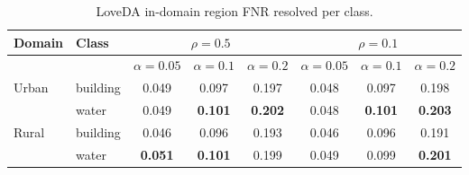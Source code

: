 \begin{table}[t]
\centering
\scriptsize
\setlength{\tabcolsep}{2pt}
\begin{tabular}{llcccccc}
\toprule
Domain & Class & \multicolumn{3}{c}{$\rho=0.5$} & \multicolumn{3}{c}{$\rho=0.1$} \\
\midrule
 & & $\alpha=0.05$ & $\alpha=0.1$ & $\alpha=0.2$ & $\alpha=0.05$ & $\alpha=0.1$ & $\alpha=0.2$ \\
\midrule
Urban & building & 0.049 & 0.097 & 0.197 & 0.048 & 0.097 & 0.198 \\
 & water & 0.049 & \textbf{0.101} & \textbf{0.202} & 0.048 & \textbf{0.101} & \textbf{0.203} \\
\addlinespace
Rural & building & 0.046 & 0.096 & 0.193 & 0.046 & 0.096 & 0.191 \\
 & water & \textbf{0.051} & \textbf{0.101} & 0.199 & 0.049 & 0.099 & \textbf{0.201} \\
\bottomrule
\end{tabular}
\caption{LoveDA in-domain region FNR resolved per class.}
\label{tab:loveda_perclass}
\end{table}
